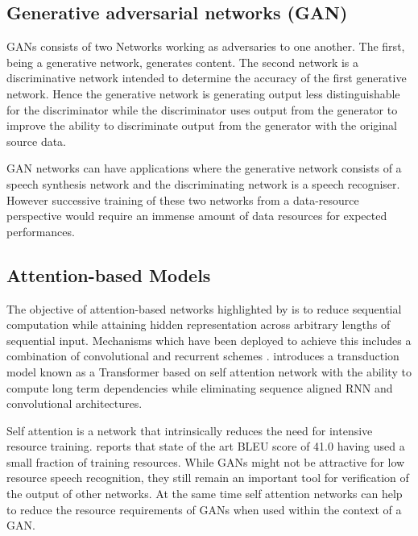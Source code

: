 \subsection{Generative adversarial networks (GAN)}

GANs consists of two Networks working as adversaries to one another.  The first, being a generative network, generates content.  The second network is a discriminative network intended to determine the accuracy of the first generative network.  Hence the generative network is generating output less distinguishable for the discriminator while the discriminator uses output from the generator to improve the ability to discriminate output from the generator with the original source data.

GAN networks can have applications where the generative network consists of a speech synthesis network and the discriminating network is  a speech recogniser.  However successive training of these two networks from a data-resource perspective would require an immense amount of data resources for expected performances. 

\subsection{Attention-based Models}

The objective of attention-based networks highlighted by  \cite{vaswani2017attention} is to reduce sequential computation while attaining hidden representation across arbitrary lengths of sequential input. Mechanisms which have been deployed to achieve this includes a combination of convolutional and recurrent schemes \citep{kaiser2016can,kalchbrenner2016neural, gehring2017convolutional}. \cite{vaswani2017attention} introduces a transduction model known as a Transformer based on self attention network with the ability to compute long term dependencies while eliminating sequence aligned RNN and convolutional architectures.

Self attention is a network that intrinsically reduces the need for intensive resource training.  \cite{vaswani2017attention} reports that state of the art BLEU score of 41.0 having used a small fraction of training resources.  While GANs might not be attractive for low resource speech recognition, they still remain an important tool for verification of the output of other networks.  At the same time self attention networks can help to reduce the resource requirements of GANs when used within the context of a GAN.

